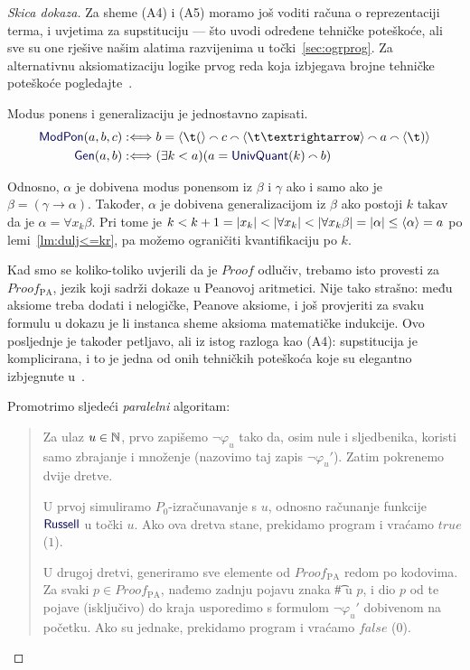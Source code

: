 \begin{proof}[Skica dokaza]
	Za sheme (A4) i (A5) moramo još voditi računa o reprezentaciji terma, i uvjetima za supstituciju --- što uvodi određene tehničke poteškoće, ali sve su one rješive našim alatima razvijenima u točki~\ref{sec:ogrprog}. Za alternativnu aksiomatizaciju logike prvog reda koja izbjegava brojne tehničke poteškoće pogledajte~\cite{smullyan}.

Modus ponens i generalizaciju je jednostavno zapisati.
\begin{align}
    \f{ModPon}(a,b,c)&:\Longleftrightarrow b=
    \kr{\t(}\conc{}
    c\conc{}
    \kr{\t\textrightarrow}\conc{}
    a\conc{}\kr{\t)}\\
    \f{Gen}(a,b)&:\Longleftrightarrow
    (\exists k<a)(a=\f{UnivQuant}(k)\conc{}b)
\end{align}

	Odnosno, $\alpha$ je dobivena modus ponensom iz $\beta$ i $\gamma$ ako i samo ako je $\beta=(\gamma\to\alpha)$. Također, $\alpha$ je dobivena generalizacijom iz $\beta$ ako postoji $k$ takav da je $\alpha=\forall x_k\beta$. Pri tome je $k<k+1=\lvert x_k\rvert<\lvert\forall x_k\rvert<\lvert\forall x_k\beta\rvert=\lvert\alpha\rvert\le\langle\alpha\rangle=a$ po lemi~\ref{lm:dulj<=kr}, pa možemo ograničiti kvantifikaciju po $k$.

    Kad smo se koliko-toliko uvjerili da je $Proof$ odlučiv, trebamo isto provesti za $Proof_{\text{PA}}$, jezik koji sadrži dokaze u Peanovoj aritmetici. Nije tako strašno: među aksiome treba dodati i nelogičke, Peanove aksiome, i još provjeriti za svaku formulu u dokazu je li instanca sheme aksioma matematičke indukcije. Ovo posljednje je također petljavo, ali iz istog razloga kao (A4): supstitucija je komplicirana, i to je jedna od onih tehničkih poteškoća koje su elegantno izbjegnute u~\cite{smullyan}.

Promotrimo sljedeći \emph{paralelni} algoritam:
\begin{quote}
    Za ulaz $u\in{\mathbb N}$, prvo zapišemo $\neg\varphi_u$ tako da, osim nule i sljedbenika, koristi samo zbrajanje i množenje (nazovimo taj zapis $\neg\varphi_u'$). Zatim pokrenemo dvije dretve.

    U prvoj simuliramo $P_0$-izračunavanje s $u$, odnosno računanje funkcije $\f{Russell}$ u točki $u$. Ako ova dretva stane, prekidamo program i vraćamo $\mathit{true}$ ($1$).

    U drugoj dretvi, generiramo sve elemente od $Proof_{\text{PA}}$ redom po kodovima. Za svaki $p\in Proof_{\text{PA}}$, nađemo zadnju pojavu znaka \t\# u $p$, i dio $p$ od te pojave (isključivo) do kraja usporedimo s formulom $\neg\varphi_u'$ dobivenom na početku. Ako su jednake, prekidamo program i vraćamo $\mathit{false}$ ($0$).
\end{quote}


\end{proof}
